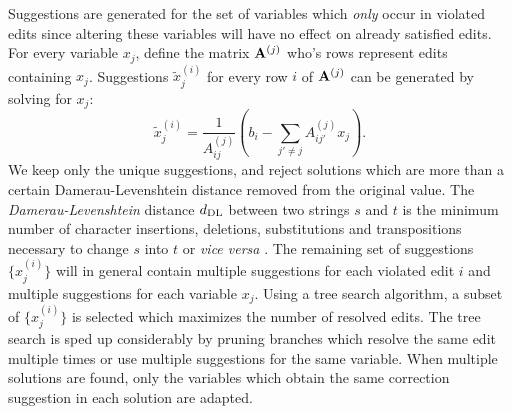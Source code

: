 \documentclass[11pt, fleqn, a4paper]{article}
\begin{document}
Suggestions are generated for the set of variables which {\em only} occur in
violated edits since altering these variables will have no effect on already
satisfied edits. For every variable $x_j$, define the matrix ${\bf A}^{(j)}$ who's
rows represent edits containing ${x}_j$. Suggestions $\tilde{x}^{(i)}_j$ for
every row $i$ of ${\bf A}^{(j)}$ can be generated by solving for ${x}_j$:
%
\begin{equation}
\tilde{x}_j^{(i)} = \frac{1}{A_{ij}^{(j)}} \left(b_i - \sum_{j'\not=j}A_{ij'}^{(j)}x_j\right).
\end{equation}
%
We keep only the unique suggestions, and reject solutions which are more than a
certain Damerau-Levenshtein distance removed from the original value. The {\em
Damerau-Levenshtein} distance $d_{\rm DL}$ between two strings $s$ and $t$ is
the minimum number of character insertions, deletions, substitutions and
transpositions necessary to change $s$ into $t$ or {\em vice versa}
\citep{damerau:1964,levenshtein:1966}.  The remaining set of suggestions
$\{x^{(i)}_j\}$ will in general contain multiple suggestions for each violated
edit $i$ and multiple suggestions for each variable $x_j$. Using a tree search
algorithm, a subset of $\{x^{(i)}_j\}$ is selected which maximizes the number
of resolved edits. The tree search is sped up considerably by pruning branches
which resolve the same edit multiple times or use multiple suggestions for the
same variable. When multiple solutions are found, only the variables which
obtain the same correction suggestion in each solution are adapted.
\end{document}
